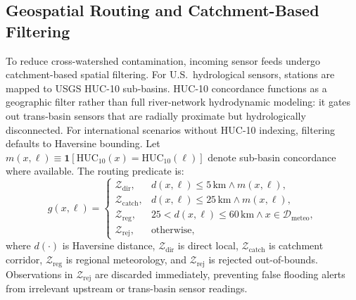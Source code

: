 \documentclass[conference]{IEEEtran}
\begin{document}
\subsection{Geospatial Routing and Catchment-Based Filtering}
To reduce cross-watershed contamination, incoming sensor feeds undergo catchment-based spatial filtering. For U.S.\ hydrological sensors, stations are mapped to USGS HUC-10 sub-basins. HUC-10 concordance functions as a geographic filter rather than full river-network hydrodynamic modeling: it gates out trans-basin sensors that are radially proximate but hydrologically disconnected. For international scenarios without HUC-10 indexing, filtering defaults to Haversine bounding. Let $m(x,\ell) \equiv \mathbf{1}[\mathrm{HUC}_{10}(x) = \mathrm{HUC}_{10}(\ell)]$ denote sub-basin concordance where available. The routing predicate is:
\begin{equation}
\label{eq:geo_gate}
g(x, \ell) =
\begin{cases}
\mathcal{Z}_{\mathrm{dir}}, & d(x,\ell) \le 5\,\text{km} \land m(x,\ell),\\[2pt]
\mathcal{Z}_{\mathrm{catch}}, & d(x,\ell) \le 25\,\text{km} \land m(x,\ell),\\[2pt]
\mathcal{Z}_{\mathrm{reg}}, & 25 < d(x,\ell) \le 60\,\text{km} \land x \in \mathcal{D}_{\mathrm{meteo}},\\[2pt]
\mathcal{Z}_{\mathrm{rej}}, & \text{otherwise,}
\end{cases}
\end{equation}
where $d(\cdot)$ is Haversine distance, $\mathcal{Z}_{\mathrm{dir}}$ is direct local, $\mathcal{Z}_{\mathrm{catch}}$ is catchment corridor, $\mathcal{Z}_{\mathrm{reg}}$ is regional meteorology, and $\mathcal{Z}_{\mathrm{rej}}$ is rejected out-of-bounds. Observations in $\mathcal{Z}_{\mathrm{rej}}$ are discarded immediately, preventing false flooding alerts from irrelevant upstream or trans-basin sensor readings.
\end{document}
